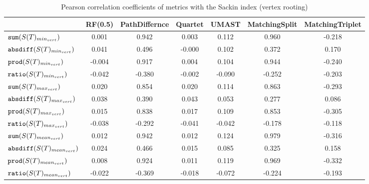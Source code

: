\begin{table}[h]
\centering
\caption{Pearson correlation coefficients of metrics with the Sackin index (vertex rooting)}
\begin{tabular}{lcccccc}
 & RF(0.5) & PathDiffernce & Quartet & UMAST & MatchingSplit & MatchingTriplet \\
\hline
${\verb+sum+}(S(T)_{min_{vert}})$ & 0.001 & 0.942 & 0.003 & 0.112 & 0.960 & -0.218 \\
${\verb+absdiff+}(S(T)_{min_{vert}})$ & 0.041 & 0.496 & -0.000 & 0.102 & 0.372 & 0.170 \\
${\verb+prod+}(S(T)_{min_{vert}})$ & -0.004 & 0.917 & 0.004 & 0.104 & 0.944 & -0.240 \\
${\verb+ratio+}(S(T)_{min_{vert}})$ & -0.042 & -0.380 & -0.002 & -0.090 & -0.252 & -0.203 \\
${\verb+sum+}(S(T)_{max_{vert}})$ & 0.020 & 0.854 & 0.020 & 0.114 & 0.863 & -0.293 \\
${\verb+absdiff+}(S(T)_{max_{vert}})$ & 0.038 & 0.390 & 0.043 & 0.053 & 0.277 & 0.086 \\
${\verb+prod+}(S(T)_{max_{vert}})$ & 0.015 & 0.838 & 0.017 & 0.109 & 0.853 & -0.305 \\
${\verb+ratio+}(S(T)_{max_{vert}})$ & -0.038 & -0.292 & -0.041 & -0.042 & -0.178 & -0.118 \\
${\verb+sum+}(S(T)_{mean_{vert}})$ & 0.012 & 0.942 & 0.012 & 0.124 & 0.979 & -0.316 \\
${\verb+absdiff+}(S(T)_{mean_{vert}})$ & 0.024 & 0.466 & 0.015 & 0.085 & 0.325 & 0.158 \\
${\verb+prod+}(S(T)_{mean_{vert}})$ & 0.008 & 0.924 & 0.011 & 0.119 & 0.969 & -0.332 \\
${\verb+ratio+}(S(T)_{mean_{vert}})$ & -0.022 & -0.369 & -0.018 & -0.072 & -0.224 & -0.193 \\
\end{tabular}
\end{table}

